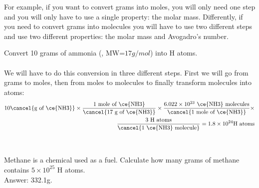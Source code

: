 \documentclass[main.tex]{subfiles}
\begin{document}
\begin{description}


For example, if you want to convert grams into moles, you will only need one step and you will only have to use a single property: the molar mass. Differently, if you need to convert grams into molecules you will have to use two different steps and use two different properties: the molar mass and Avogadro's number.

\begin{example} %
Convert 10 grams of ammonia (, MW=$17g/mol$) into H atoms.\\
\\
We will have to do this conversion in three different steps. First we will go from grams to moles, then from moles to molecules to finally transform molecules into atoms:
 \begin{equation*}\begin{split}
10  \cancel{\text{g of \ce{NH3}}} \times 
\dfrac{\text{1 mole of \ce{NH3}} } { \cancel{\text{17 g of \ce{NH3}}} } \times
\dfrac{6.022\times 10^{23}\text{ \ce{NH3} molecules} }{\cancel{\text{1 mole of \ce{NH3}}}} \times \\
\dfrac{\text{3 H atoms} } { \cancel{\text{1 \ce{NH3} molecule}} } =1.8\times 10^{24}\text{H atoms}
\end{split}\end{equation*}\\
\faDiamond\ \\
Methane is a chemical used as a fuel. Calculate how many grams of methane  contains $5\times 10^{25}$ H atoms. \\
\flushright Answer: 332.1g.
\end{example}%
\end{description}
\end{document}
